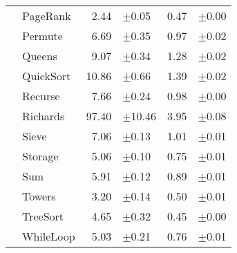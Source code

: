 \begin{tabular}{llrlrl}
 & PageRank & 2.44 & \scriptsize\textcolor{gray!60}{$\pm$0.05} & 0.47 & \scriptsize\textcolor{gray!60}{$\pm$0.00} \\
 & Permute & 6.69 & \scriptsize\textcolor{gray!60}{$\pm$0.35} & 0.97 & \scriptsize\textcolor{gray!60}{$\pm$0.02} \\
 & Queens & 9.07 & \scriptsize\textcolor{gray!60}{$\pm$0.34} & 1.28 & \scriptsize\textcolor{gray!60}{$\pm$0.02} \\
 & QuickSort & 10.86 & \scriptsize\textcolor{gray!60}{$\pm$0.66} & 1.39 & \scriptsize\textcolor{gray!60}{$\pm$0.02} \\
 & Recurse & 7.66 & \scriptsize\textcolor{gray!60}{$\pm$0.24} & 0.98 & \scriptsize\textcolor{gray!60}{$\pm$0.00} \\
 & Richards & 97.40 & \scriptsize\textcolor{gray!60}{$\pm$10.46} & 3.95 & \scriptsize\textcolor{gray!60}{$\pm$0.08} \\
 & Sieve & 7.06 & \scriptsize\textcolor{gray!60}{$\pm$0.13} & 1.01 & \scriptsize\textcolor{gray!60}{$\pm$0.01} \\
 & Storage & 5.06 & \scriptsize\textcolor{gray!60}{$\pm$0.10} & 0.75 & \scriptsize\textcolor{gray!60}{$\pm$0.01} \\
 & Sum & 5.91 & \scriptsize\textcolor{gray!60}{$\pm$0.12} & 0.89 & \scriptsize\textcolor{gray!60}{$\pm$0.01} \\
 & Towers & 3.20 & \scriptsize\textcolor{gray!60}{$\pm$0.14} & 0.50 & \scriptsize\textcolor{gray!60}{$\pm$0.01} \\
 & TreeSort & 4.65 & \scriptsize\textcolor{gray!60}{$\pm$0.32} & 0.45 & \scriptsize\textcolor{gray!60}{$\pm$0.00} \\
 & WhileLoop & 5.03 & \scriptsize\textcolor{gray!60}{$\pm$0.21} & 0.76 & \scriptsize\textcolor{gray!60}{$\pm$0.01} \\
\bottomrule
\end{tabular}
